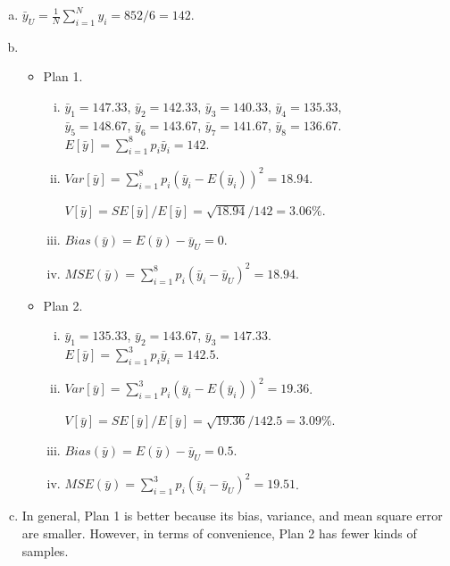\documentclass[12pt]{article}
\begin{document}
    \begin{solution}
        \begin{enumerate}[(a)]
            \item $\bar{y}_U=\frac{1}{N}\sum_{i=1}^N y_i=852/6=142. $
            \item 
            \begin{itemize}
                \item Plan 1. 
                \begin{enumerate}[(i)]
                    \item $\bar{y}_1=147.33$, $\bar{y}_2=142.33$, $\bar{y}_3=140.33$, $\bar{y}_4=135.33$, \\
                    $\bar{y}_5=148.67$, $\bar{y}_6=143.67$, $\bar{y}_7=141.67$, $\bar{y}_8=136.67$.\\
                    $E[\bar{y}]=\sum_{i=1}^8p_i\bar{y}_i=142$. 

                    \item $Var[\bar{y}]=\sum_{i=1}^8p_i(\bar{y}_i-E(\bar{y}_i))^2=18.94$. 
                    
                    $V[\bar{y}]=SE[\bar{y}]/E[\bar{y}]=\sqrt{18.94}/142=3.06\%$. 
                    
                    \item $Bias(\bar{y})=E(\bar{y})-\bar{y}_U=0$. 
                    
                    \item $MSE(\bar{y})=\sum_{i=1}^8p_i(\bar{y}_i-\bar{y}_U)^2=18.94$. 
                \end{enumerate}
                \item Plan 2.  
                \begin{enumerate}[(i)]
                    \item $\bar{y}_1=135.33$, $\bar{y}_2=143.67$, $\bar{y}_3=147.33$.\\
                    $E[\bar{y}]=\sum_{i=1}^3p_i\bar{y}_i=142.5$. 
                    \item $Var[\bar{y}]=\sum_{i=1}^3p_i(\bar{y}_i-E(\bar{y}_i))^2=19.36$. 
                    
                    $V[\bar{y}]=SE[\bar{y}]/E[\bar{y}]=\sqrt{19.36}/142.5=3.09\%$. 
                    \item $Bias(\bar{y})=E(\bar{y})-\bar{y}_U=0.5$. 
                    \item $MSE(\bar{y})=\sum_{i=1}^3p_i(\bar{y}_i-\bar{y}_U)^2=19.51$. 
                \end{enumerate}
            \end{itemize}
            \item In general, Plan 1 is better because its bias, variance, and mean square error are smaller. However, in terms of convenience, Plan 2 has fewer kinds of samples. 
        \end{enumerate}
        
    \end{solution}
\end{document}
